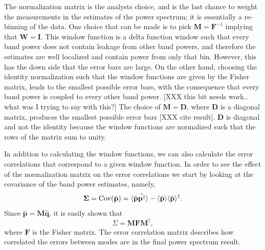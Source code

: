 \documentclass[twocolumn,numberedappendix]{emulateapj} \shorttitle{PSA64}
\newcommand{\phat}{\hat{\mathbf{p}}}
\newcommand{\qhat}{\hat{\mathbf{q}}}
\begin{document}
%
The normalization matrix is the analysts choice, and is the last chance to
weight the measurements in the estimates of the power spectrum; it is
essentially a re-binning of the data. One choice that can be made is to pick
$\mathbf{M} = \mathbf{F}^{-1}$ implying that $\mathbf{W} = \mathbf{I}$. This
window function is a delta function window such that every band power does not
contain leakage from other band powers, and therefore the estimates are well
localized and contain power from only that bin. However, this has the down side
that the error bars are large.  On the other hand, choosing the identity
normalization such that the window functions are given by the Fisher matrix,
leads to the smallest possible error bars, with the consequence that every
band power is coupled to every other band power.  
[XXX this bit needs work.. what was I trying to say with this?]
The choice of $\mathbf{M} =
\mathbf{D}$, where $\mathbf{D}$ is a diagonal matrix, produces the smallest
possible error bars [XXX cite result]. $\mathbf{D}$ is diagonal and not the
identity because the window functions are normalized such that the rows of the
matrix sum to unity.  

In addition to calculating the window functions, we can also calculate the error
correlations that correspond to a given window function. In order to see the
effect of the normalization matrix on the error correlations we start by looking
at the covariance of the band power estimates, namely, 
\begin{equation}\label{eqn:err_cov}
    \boldsymbol \Sigma = \text{Cov}(\hat{\mathbf{p}}) = \expval{\hat{\mathbf{p}}\hat{\mathbf{p}^{\dagger}}} -
             \expval{\hat{\mathbf{p}}}\expval{\hat{\mathbf{p}}}^{\dagger}.
\end{equation}
Since $\phat = \mathbf{M}\qhat$, it is easily shown that 
\begin{equation}
    \Sigma = \mathbf{M}\mathbf{F}\mathbf{M}^{\dagger},
\end{equation}
where $\mathbf{F}$ is the Fisher matrix. The error correlation matrix describes
how correlated the errors between modes are in the final power spectrum result.
\end{document}
